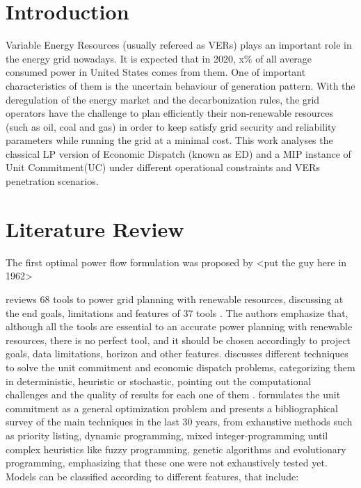 \documentclass[12pt,LUDisStyle,twosided]{book}
\begin{document}
\pagestyle{plain}
\dissertationtrue



\tableofcontents
\nopagebreak
{}
\listoftables
{}
\listoffigures
\newpage
\pagestyle{plain}

\pagestyle{plain}

\chapter{Introduction}

Variable Energy Resources (usually refereed as VERs) plays an important role in the energy grid nowadays. It is expected that in 2020, x\% of all average consumed power in United States comes from them. One of important characteristics of them is the uncertain behaviour of generation pattern. With the deregulation of the energy market and the decarbonization rules, the grid operators have the challenge to plan efficiently their non-renewable resources (such as oil, coal and gas) in order to keep satisfy grid security and reliability parameters while running the grid at a minimal cost. This work analyses the classical LP version of Economic Dispatch (known as ED) and a MIP instance of Unit Commitment(UC) under different operational constraints and VERs penetration  scenarios.

\chapter{Literature Review}


The first optimal power flow formulation was proposed by <put the guy here in 1962>

\citeauthor{connolly} reviews 68 tools to power grid planning with renewable resources, discussing at the end goals, limitations and features of 37 tools \cite{connolly}. The authors emphasize that, although all the tools are essential to an accurate power planning with renewable resources, there is no perfect tool, and it should be chosen accordingly to project goals, data limitations, horizon and other features. 
\citeauthor{yamin} discusses different techniques to solve the unit commitment and economic dispatch problems, categorizing them in deterministic, heuristic or stochastic, pointing out the computational challenges and the quality of results for each one of them \cite{yamin}. 
\citeauthor{padhy} formulates the unit commitment as a general optimization problem and presents a bibliographical survey of the main techniques in the last 30 years, from exhaustive methods such as priority listing, dynamic programming, mixed integer-programming  until complex heuristics like fuzzy programming, genetic algorithms and evolutionary programming, emphasizing that these one were not exhaustively tested yet. Models can be classified according to different features, that include:
\end{document}
